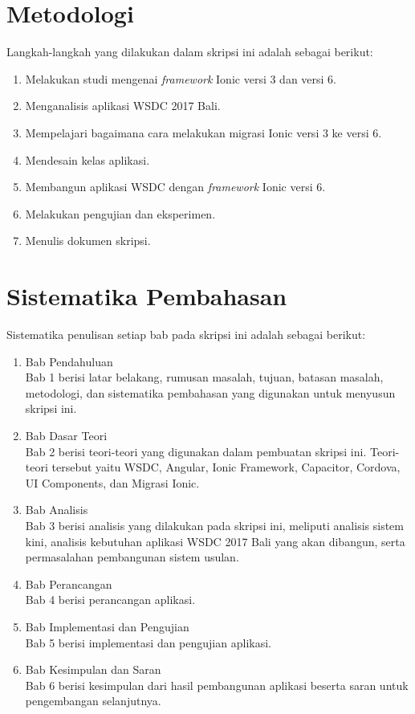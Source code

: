 \section{Metodologi}
\label{sec:metlit}

Langkah-langkah yang dilakukan dalam skripsi ini adalah sebagai berikut:

\begin{enumerate}
	\item Melakukan studi mengenai {\it framework} Ionic versi 3 dan versi 6.
	\item Menganalisis aplikasi WSDC 2017 Bali.
	\item Mempelajari bagaimana cara melakukan migrasi Ionic versi 3 ke versi 6.
	\item Mendesain kelas aplikasi.
	\item Membangun aplikasi WSDC dengan {\it framework} Ionic versi 6. 
	\item Melakukan pengujian dan eksperimen.
	\item Menulis dokumen skripsi.
\end{enumerate}


\section{Sistematika Pembahasan}
\label{sec:sispem}

Sistematika penulisan setiap bab pada skripsi ini adalah sebagai berikut:
\begin{enumerate}
	\item Bab Pendahuluan \\
	Bab 1 berisi latar belakang, rumusan masalah, tujuan, batasan masalah, metodologi, dan sistematika pembahasan yang digunakan untuk menyusun skripsi ini.
	\item Bab Dasar Teori \\
	Bab 2 berisi teori-teori yang digunakan dalam pembuatan skripsi ini. Teori-teori tersebut yaitu WSDC, Angular, Ionic Framework, Capacitor, Cordova, UI Components, dan Migrasi Ionic.
	\item Bab Analisis \\
	Bab 3 berisi analisis yang dilakukan pada skripsi ini, meliputi analisis sistem kini, analisis kebutuhan aplikasi WSDC 2017 Bali yang akan dibangun, serta permasalahan pembangunan sistem usulan.
	\item Bab Perancangan \\
	Bab 4 berisi perancangan aplikasi.
	\item Bab Implementasi dan Pengujian \\
	Bab 5 berisi implementasi dan pengujian aplikasi.
	\item Bab Kesimpulan dan Saran \\
	Bab 6 berisi kesimpulan dari hasil pembangunan aplikasi beserta saran untuk pengembangan selanjutnya.
	\end{enumerate}
